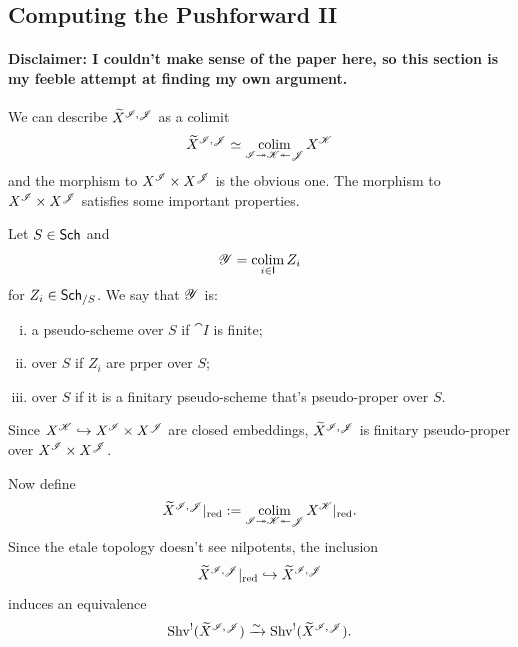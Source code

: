 \documentclass[oneside]{amsart}
\begin{document}
\subsection{Computing the Pushforward II}
\paragraph{\textbf{Disclaimer:} I couldn't make sense of the paper here, so this section is my feeble attempt at finding my own argument.}

We can describe $\widetilde{X}^{\mathscr{I},\mathscr{J}}$ as a colimit
\[
	\widetilde{X}^{\mathscr{I},\mathscr{J}} \simeq \operatorname*{colim}_{\mathscr{I}\twoheadrightarrow\mathscr{K}\twoheadleftarrow\mathscr{J}} X^{\mathscr{K}}
\] 
and the morphism to $X^{\mathscr{I}}\times X^{\mathscr{J}}$ is the obvious one. The morphism to $X^{\mathscr{I}}\times X^{\mathscr{J}}$ satisfies some important properties.
\begin{definition}
	Let $S\in \mathsf{Sch}$ and
	\[
		\mathscr{Y} = \operatorname*{colim}_{i\in \mathsf{I}}Z_i
	\] 
	for $Z_i\in \mathsf{Sch}_{/S}$. We say that $\mathscr{Y}$ is:
	\begin{enumerate}[(i)]
		\item a  pseudo-scheme over $S$ if $\cat{I}$ is finite;
		\item {} over $S$ if $Z_i$ are prper over $S$;
		\item {} over $S$ if it is a finitary pseudo-scheme that's pseudo-proper over $S$.
	\end{enumerate}
\end{definition}
Since $X^{\mathscr{K}}\hookrightarrow X^{\mathscr{I}}\times X^{\mathscr{J}}$ are closed embeddings, $\widetilde{X}^{\mathscr{I},\mathscr{J}}$ is finitary pseudo-proper over $X^{\mathscr{I}}\times X^{\mathscr{J}}$.

Now define
\[
	\widetilde{X}^{\mathscr{I},\mathscr{J}}|_{\mathrm{red}} := \operatorname*{colim}_{\mathscr{I}\twoheadrightarrow \mathscr{K} \twoheadleftarrow \mathscr{J}}X^{\mathscr{K}}|_{\mathrm{red}}.
\] 
Since the etale topology doesn't see nilpotents, the inclusion
\[
	\widetilde{X}^{\mathscr{I},\mathscr{J}}|_{\mathrm{red}} \hookrightarrow \widetilde{X}^{\mathscr{I},\mathscr{J}}
\] 
induces an equivalence
\[
	\operatorname{Shv}^{!}(\widetilde{X}^{\mathscr{I},\mathscr{J}}) \xrightarrow{\sim} \operatorname{Shv}^{!}(\widetilde{X}^{\mathscr{I},\mathscr{J}}).
\] 
\end{document}
